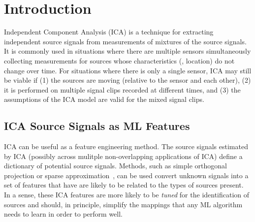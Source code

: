 \documentclass[10pt]{article}
\begin{document}
\section{Introduction}
Independent Component Analysis (ICA) is a technique for extracting independent source
signals from measurements of mixtures of the source signals\cite{sklearn-bss,hyvarinen:2000,
tharwat:2021}. It is commonly used in situations where there are multiple sensors
simultaneously collecting measurements for sources whose characteristics (\eg, location)
do not change over time. For situations where there is only a single sensor, ICA may still
be viable if (1) the sources are moving (relative to the sensor and each other), (2) it is
performed on multiple signal clips recorded at different times, and (3) the assumptions of
the ICA model are valid for the mixed signal clips.

\subsection*{ICA Source Signals as ML Features}
ICA can be useful as a feature engineering method. The source signals estimated by ICA
(possibly across mulitple non-overlapping applications of ICA) define a dictionary of
potential source signals. Methods, such as simple orthogonal projection or sparse
approximation~\cite{blumensath:2009,needell:2009,wikipedia-sparse-approximation}, can be
used convert unknown signals into a set of features that have are likely to be related to
the types of sources present. In a sense, these ICA features are more likely to be
\emph{tuned} for the identification of sources and should, in principle, simplify the
mappings that any ML algorithm needs to learn in order to perform well.
\end{document}
